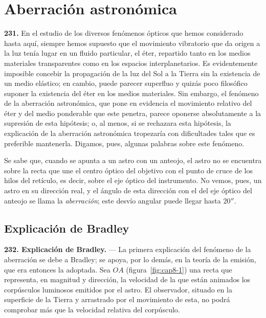 \chapter{Aberración astronómica}
\label{cap:aberracion}

\noindent\textbf{231.} En el estudio de los diversos fenómenos ópticos que
hemos considerado hasta aquí, siempre hemos supuesto que el movimiento
vibratorio que da origen a la luz tenía lugar en un fluido particular, el
éter, repartido tanto en los medios materiales transparentes como en los
espacios interplanetarios. Es evidentemente imposible concebir la
propagación de la luz del Sol a la Tierra sin la existencia de un medio
elástico; en cambio, puede parecer superfluo y quizás poco filosófico
suponer la existencia del éter en los medios materiales. Sin embargo, el
fenómeno de la aberración astronómica, que pone en evidencia el movimiento
relativo del éter y del medio ponderable que este penetra, parece oponerse
absolutamente a la supresión de esta hipótesis; o, al menos, si se
rechazara esta hipótesis, la explicación de la aberración astronómica
tropezaría con dificultades tales que es preferible mantenerla. Digamos,
pues, algunas palabras sobre este fenómeno.

Se sabe que, cuando se apunta a un astro con un anteojo, el astro no se
encuentra sobre la recta que une el centro óptico del objetivo con el
punto de cruce de los hilos del retículo, es decir, sobre el eje óptico del
instrumento. No vemos, pues, un astro en su dirección real, y el ángulo de
esta dirección con el del eje óptico del anteojo se llama la \emph{aberración};
este desvío angular puede llegar hasta $20''$.

\section{Explicación de Bradley}

\noindent\textbf{232. Explicación de Bradley.} — La primera explicación
del fenómeno de la aberración se debe a Bradley; se apoya, por lo demás, en
la teoría de la emisión, que era entonces la adoptada. Sea $OA$
(figura~\ref{fig:cap8-1}) una recta que representa, en magnitud y
dirección, la velocidad de la que están animados los corpúsculos luminosos
emitidos por el astro. El observador, situado en la superficie de la
Tierra y arrastrado por el movimiento de esta, no podrá comprobar más que
la velocidad relativa del corpúsculo.

